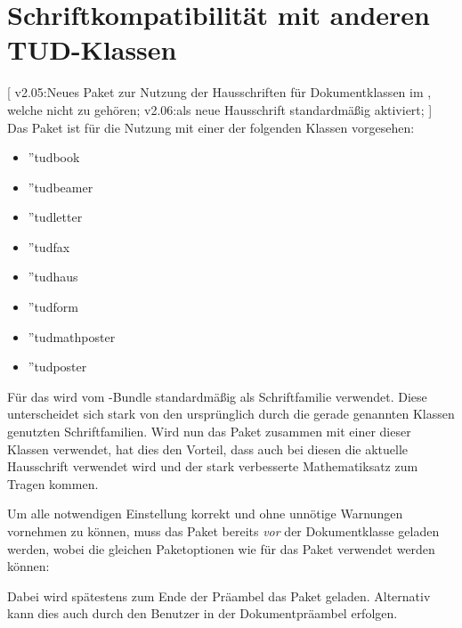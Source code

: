 \section[%
  Das Paket \Package{fix-tudscrfonts} -- Schriftkompatibilität%
]{%
  Schriftkompatibilität mit anderen TUD-Klassen%
}
%
\begin{DeclareEntity}{}[%
  v2.05:Neues Paket zur Nutzung der Hausschriften für Dokumentklassen im 
  \TUDCD, welche nicht zu \TUDScript gehören;%
  v2.06:\OpenSans als neue Hausschrift standardmäßig aktiviert;%
]
%
Das Paket  ist für die Nutzung mit einer der folgenden 
Klassen vorgesehen:
\begin{itemize}
\item \Class''{tudbook}
\item \Class''{tudbeamer}
\item \Class''{tudletter}
\item \Class''{tudfax}
\item \Class''{tudhaus}
\item \Class''{tudform}
\item \Class''{tudmathposter}
\item \Class''{tudposter}
\end{itemize}
%
Für das \TUDCD wird vom \TUDScript-Bundle standardmäßig \OpenSans als 
Schriftfamilie verwendet. Diese unterscheidet sich stark von den ursprünglich 
durch die gerade genannten Klassen genutzten Schriftfamilien. Wird nun das 
Paket  zusammen mit einer dieser Klassen verwendet, 
hat dies den Vorteil, dass auch bei diesen die aktuelle Hausschrift verwendet 
wird und der stark verbesserte Mathematiksatz zum Tragen kommen.
%

Um alle notwendigen Einstellung korrekt und ohne unnötige Warnungen vornehmen 
zu können, muss das Paket  bereits \emph{vor} der 
Dokumentklasse geladen werden, wobei die gleichen Paketoptionen wie für das 
Paket  verwendet werden können:
%
\begin{quoting}[rightmargin=0pt]
\end{quoting}
%
Dabei wird spätestens zum Ende der Präambel das Paket  
geladen. Alternativ kann dies auch durch den Benutzer in der Dokumentpräambel 
erfolgen.
\end{DeclareEntity}



